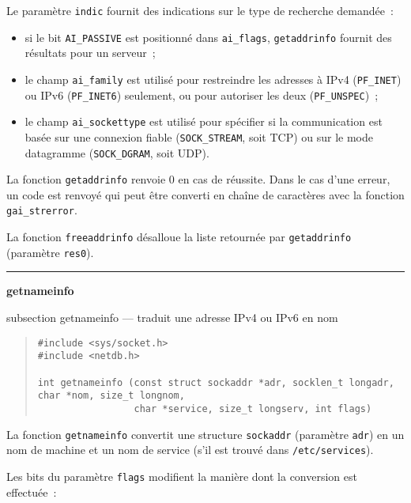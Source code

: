 \documentclass [twoside] {report}
\newcommand {\primitive} [1]
    {
	{\large \bf #1}
	\addcontentsline {toc} {subsection} {#1}
    }
\newcommand {\separation}
    {
	\vspace {7mm}
	\nopagebreak
	\hrule
    }
\begin{document}
Le paramètre \texttt {indic} fournit des indications sur le type 
de recherche demandée~:

\begin {itemize}
    \item si le bit \texttt {AI\_PASSIVE} est positionné dans \texttt
	{ai\_flags}, \texttt {getaddrinfo} fournit des résultats pour
	un serveur~;

    \item le champ \texttt {ai\_family} est utilisé pour restreindre
	les adresses à IPv4 (\texttt {PF\_INET}) ou IPv6 (\texttt
	{PF\_INET6}) seulement, ou pour autoriser les deux (\texttt
	{PF\_UNSPEC})~;

    \item le champ \texttt {ai\_sockettype} est utilisé pour spécifier
	si la communication est basée sur une connexion fiable
	(\texttt {SOCK\_STREAM}, soit TCP) ou sur le mode datagramme
	(\texttt {SOCK\_DGRAM}, soit UDP).

\end {itemize}

La fonction \texttt {getaddrinfo} renvoie 0 en cas de réussite.
Dans le cas d'une erreur, un code est renvoyé qui peut être converti
en chaîne de caractères avec la fonction \texttt {gai\_strerror}.

La fonction {\tt freeaddrinfo} désalloue la liste retournée par
\texttt {getaddrinfo} (paramètre \texttt {res0}).


\separation
\primitive {getnameinfo} --- traduit une adresse IPv4 ou IPv6 en nom

\begin {quote}
\begin {verbatim}
#include <sys/socket.h>
#include <netdb.h>

int getnameinfo (const struct sockaddr *adr, socklen_t longadr, char *nom, size_t longnom,
                 char *service, size_t longserv, int flags)
\end{verbatim}
\end {quote}

La fonction \texttt {getnameinfo} convertit une structure \texttt
{sockaddr} (paramètre \texttt {adr}) en un nom de machine et un nom
de service (s'il est trouvé dans \texttt {/etc/services}).

Les bits du paramètre \texttt {flags} modifient la manière dont la
conversion est effectuée~:
\end{document}
